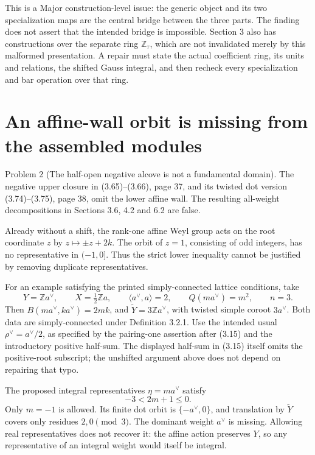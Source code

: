 \documentclass[10pt]{article}
\begin{document}
This is a Major construction-level issue: the generic object and its two specialization maps are the central bridge between the three parts. The finding does not assert that the intended bridge is impossible. Section 3 also has constructions over the separate ring \(\mathbb Z_\tau\), which are not invalidated merely by this malformed presentation. A repair must state the actual coefficient ring, its units and relations, the shifted Gauss integral, and then recheck every specialization and bar operation over that ring.\par
\section*{An affine-wall orbit is missing from the assembled modules}
Problem 2 (The half-open negative alcove is not a fundamental domain).  The negative upper closure in (3.65)–(3.66), page 37, and its twisted dot version (3.74)–(3.75), page 38, omit the lower affine wall. The resulting all-weight decompositions in Sections 3.6, 4.2 and 6.2 are false.\par
Already without a shift, the rank-one affine Weyl group acts on the root coordinate \(z\) by \(z\mapsto\pm z+2k\). The orbit of \(z=1\), consisting of odd integers, has no representative in \((-1,0]\). Thus the strict lower inequality cannot be justified by removing duplicate representatives.\par
For an example satisfying the printed simply-connected lattice conditions, take \[Y=\mathbb Za^\vee,\qquad X=\tfrac12\mathbb Za,\qquad
 \langle a^\vee,a\rangle=2,\qquad Q(ma^\vee)=m^2,\qquad n=3.\] Then \(B(ma^\vee,ka^\vee)=2mk\), and \(\widetilde Y=3\mathbb Za^\vee\), with twisted simple coroot \(3a^\vee\). Both data are simply-connected under Definition 3.2.1. Use the intended usual \(\rho^\vee=a^\vee/2\), as specified by the pairing-one assertion after (3.15) and the introductory positive half-sum. The displayed half-sum in (3.15) itself omits the positive-root subscript; the unshifted argument above does not depend on repairing that typo.\par
The proposed integral representatives \(\eta=ma^\vee\) satisfy \[-3<2m+1\le0.\] Only \(m=-1\) is allowed. Its finite dot orbit is \(\{-a^\vee,0\}\), and translation by \(\widetilde Y\) covers only residues \(2,0\pmod3\). The dominant weight \(a^\vee\) is missing. Allowing real representatives does not recover it: the affine action preserves \(Y\), so any representative of an integral weight would itself be integral.\par
\end{document}
